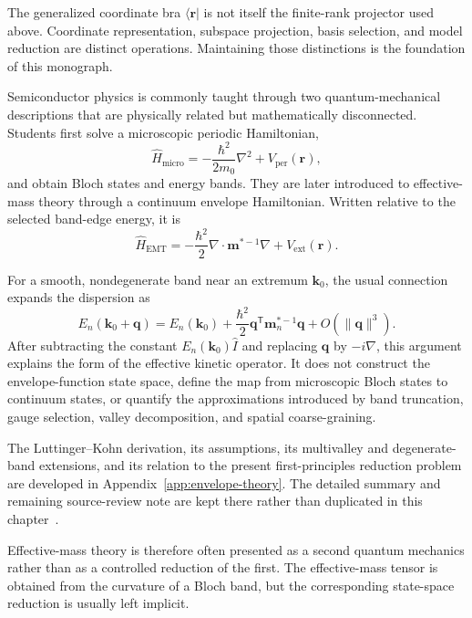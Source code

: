 The generalized coordinate bra $\langle\mathbf r\rvert$ is not itself the
finite-rank projector used above. Coordinate representation, subspace
projection, basis selection, and model reduction are distinct operations.
Maintaining those distinctions is the foundation of this monograph.

Semiconductor physics is commonly taught through two quantum-mechanical
descriptions that are physically related but mathematically disconnected.
Students first solve a microscopic periodic Hamiltonian,
\begin{equation}
    \hat H_{\mathrm{micro}}
    =
    -\frac{\hbar^2}{2m_0}\nabla^2
    +
    V_{\mathrm{per}}(\mathbf r),
\end{equation}
and obtain Bloch states and energy bands. They are later introduced to
effective-mass theory through a continuum envelope Hamiltonian. Written
relative to the selected band-edge energy, it is
\begin{equation}
    \hat H_{\mathrm{EMT}}
    =
    -\frac{\hbar^2}{2}
    \nabla\mathbin{\cdot}\mathbf m^{*-1}\nabla
    +
    V_{\mathrm{ext}}(\mathbf r).
\end{equation}

For a smooth, nondegenerate band near an extremum $\mathbf k_0$, the usual
connection expands the dispersion as
\begin{equation}
    E_n(\mathbf k_0+\mathbf q)
    =
    E_n(\mathbf k_0)
    +
    \frac{\hbar^2}{2}
    \mathbf q^{\mathsf T}\mathbf m_n^{*-1}\mathbf q
    +
    O\!\left(\lVert\mathbf q\rVert^3\right).
\end{equation}
After subtracting the constant $E_n(\mathbf k_0)\hat I$ and replacing
$\mathbf q$ by $-i\nabla$, this argument explains the form of the effective
kinetic operator. It does not construct the envelope-function state space,
define the map from microscopic Bloch states to continuum states, or quantify
the approximations introduced by band truncation, gauge selection, valley
decomposition, and spatial coarse-graining.

The Luttinger--Kohn derivation, its assumptions, its multivalley and degenerate-
band extensions, and its relation to the present first-principles reduction
problem are developed in Appendix~\ref{app:envelope-theory}. The detailed
summary and remaining source-review note are kept there rather than duplicated
in this chapter~\cite{luttingerKohn1955}.

Effective-mass theory is therefore often presented as a second quantum
mechanics rather than as a controlled reduction of the first. The
effective-mass tensor is obtained from the curvature of a Bloch band, but the
corresponding state-space reduction is usually left implicit.

